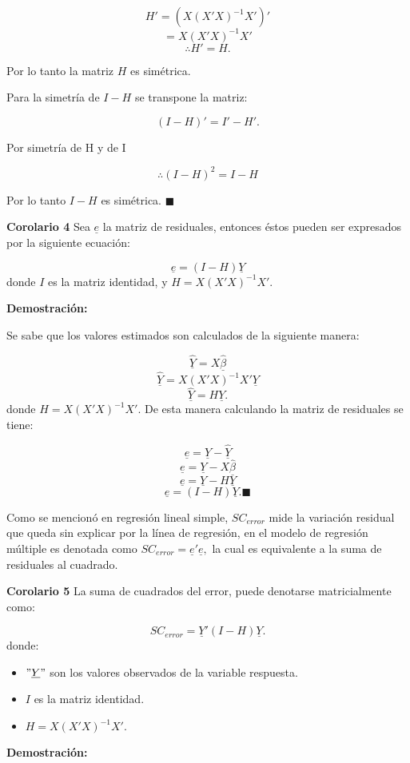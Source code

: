 \documentclass[
  a4paper,
  oneside,
  openany]{book}
\begin{document}
\[H'= (X(X'X)^{-1}X')'\]
\[=X(X'X)^{-1}X'\]
\[\therefore H'= H.\]

Por lo tanto la matriz \(H\) es simétrica.

Para la simetría de \(I-H\) se transpone la matriz:

\[(I-H)'=I'-H'.\]

Por simetría de H y de I

\[\therefore (I-H)^2=I-H\]

Por lo tanto \(I-H\) es simétrica. \(\blacksquare\)

\textbf{Corolario 4} Sea \(\underline{e}\) la matriz de residuales, entonces éstos pueden ser expresados por la siguiente ecuación:

\[\underline{e}=(I-H)\underline{Y}\]
donde \(I\) es la matriz identidad, y \(H=X(X'X)^{-1}X'.\)

\textbf{Demostración:}

Se sabe que los valores estimados son calculados de la siguiente manera:

\[\underline{\hat{Y}}=X\underline{\hat{\beta}}\]
\[\underline{\hat{Y}}=X(X'X)^{-1}X'\underline{Y}\]
\[\underline{\hat{Y}}=H\underline{Y}.\]
donde \(H=X(X'X)^{-1}X'.\) De esta manera calculando la matriz de residuales se tiene:

\[\underline{e}=\underline{Y}-\underline{\hat{Y}}\]
\[\underline{e}=\underline{Y}-X\underline{\hat{\beta}}\]
\[\underline{e}=\underline{Y}-H\underline{Y}\]
\[\underline{e}=(I-H)\underline{Y}.\blacksquare\]

Como se mencionó en regresión lineal simple, \(SC_{error}\) mide la variación residual que queda sin explicar por la línea de regresión, en el modelo de regresión múltiple es denotada como \(SC_{error}=\underline{e}'\underline{e},\) la cual es equivalente a la suma de residuales al cuadrado.

\textbf{Corolario 5} La suma de cuadrados del error, puede denotarse matricialmente como:

\[SC_{error}=\underline{Y}'(I-H)\underline{Y}.\]
donde:

\begin{itemize}
\item
  \("\underline{Y}"\) son los valores observados de la variable respuesta.
\item
  \(I\) es la matriz identidad.
\item
  \(H=X(X'X)^{-1}X'.\)
\end{itemize}

\textbf{Demostración:}
\end{document}
